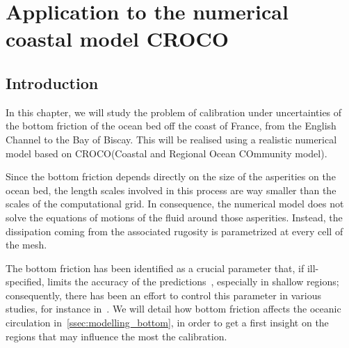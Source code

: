 \documentclass[../../Main_ManuscritThese.tex]{subfiles}
\newcommand{\CROCO}{CROCO}
\begin{document}
\chapter{Application to the numerical coastal model \CROCO}
\label{chap:croco}
\minitoc
\newpage
\subfileLocal{\pagestyle{contentStyle}}


 

\section{Introduction}
\label{sec:intro_croco}

In this chapter, we will study the problem of calibration under
uncertainties of the bottom friction of the ocean bed off the coast of
France, from the English Channel to the Bay of Biscay. This will be
realised using a realistic numerical model based on
CROCO\footnotemark[1] (Coastal and Regional Ocean COmmunity model).

Since the bottom friction depends directly on the size of the
asperities on the ocean bed, the length scales involved in this
process are way smaller than the scales of the computational grid. In
consequence, the numerical model does not solve the equations of
motions of the fluid around those asperities. Instead, the dissipation
coming from the associated rugosity is parametrized at every cell of
the mesh.

The bottom friction has been identified as a crucial parameter that,
if ill-specified, limits the accuracy of the
predictions~\citep{sinha_principal_1997,kreitmair_effect_2019},
especially in shallow regions; consequently, there has been an effort
to control this parameter in various studies, for instance
in~\cite{das_variational_1992,das_estimation_1991,boutet_estimation_2015}.
We will detail how bottom friction affects the oceanic circulation
in~\cref{ssec:modelling_bottom}, in order to get a first insight on
the regions that may influence the most the calibration.
\end{document}

